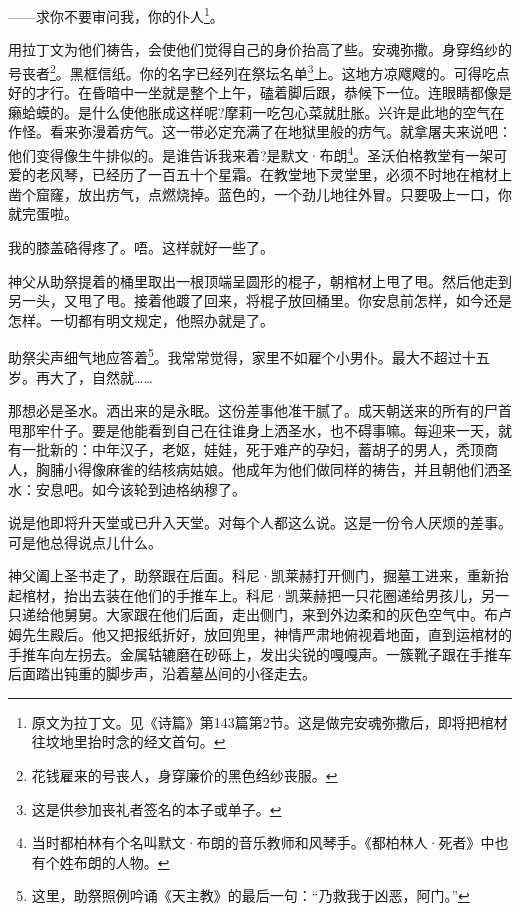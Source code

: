 \par ——求你不要审问我，你的仆人\footnote{原文为拉丁文。见《诗篇》第143篇第2节。这是做完安魂弥撒后，即将把棺材往坟地里抬时念的经文首句。}。
\par 用拉丁文为他们祷告，会使他们觉得自己的身价抬高了些。安魂弥撒。身穿绉纱的号丧者\footnote{花钱雇来的号丧人，身穿廉价的黑色绉纱丧服。}。黑框信纸。你的名字已经列在祭坛名单\footnote{这是供参加丧礼者签名的本子或单子。}上。这地方凉飕飕的。可得吃点好的才行。在昏暗中一坐就是整个上午，磕着脚后跟，恭候下一位。连眼睛都像是癞蛤蟆的。是什么使他胀成这样呢?摩莉一吃包心菜就肚胀。兴许是此地的空气在作怪。看来弥漫着疠气。这一带必定充满了在地狱里般的疠气。就拿屠夫来说吧：他们变得像生牛排似的。是谁告诉我来着?是默文·布朗\footnote{当时都柏林有个名叫默文·布朗的音乐教师和风琴手。《都柏林人·死者》中也有个姓布朗的人物。}。圣沃伯格教堂有一架可爱的老风琴，已经历了一百五十个星霜。在教堂地下灵堂里，必须不时地在棺材上凿个窟窿，放出疠气，点燃烧掉。蓝色的，一个劲儿地往外冒。只要吸上一口，你就完蛋啦。
\par 我的膝盖硌得疼了。唔。这样就好一些了。
\par 神父从助祭提着的桶里取出一根顶端呈圆形的棍子，朝棺材上甩了甩。然后他走到另一头，又甩了甩。接着他踱了回来，将棍子放回桶里。你安息前怎样，如今还是怎样。一切都有明文规定，他照办就是了。
\par 助祭尖声细气地应答着\footnote{这里，助祭照例吟诵《天主教》的最后一句：“乃救我于凶恶，阿门。”}。我常常觉得，家里不如雇个小男仆。最大不超过十五岁。再大了，自然就……
\par 那想必是圣水。洒出来的是永眠。这份差事他准干腻了。成天朝送来的所有的尸首甩那牢什子。要是他能看到自己在往谁身上洒圣水，也不碍事嘛。每迎来一天，就有一批新的：中年汉子，老妪，娃娃，死于难产的孕妇，蓄胡子的男人，秃顶商人，胸脯小得像麻雀的结核病姑娘。他成年为他们做同样的祷告，并且朝他们洒圣水：安息吧。如今该轮到迪格纳穆了。
\par 说是他即将升天堂或已升入天堂。对每个人都这么说。这是一份令人厌烦的差事。可是他总得说点儿什么。
\par 神父阖上圣书走了，助祭跟在后面。科尼·凯莱赫打开侧门，掘墓工进来，重新抬起棺材，抬出去装在他们的手推车上。科尼·凯莱赫把一只花圈递给男孩儿，另一只递给他舅舅。大家跟在他们后面，走出侧门，来到外边柔和的灰色空气中。布卢姆先生殿后。他又把报纸折好，放回兜里，神情严肃地俯视着地面，直到运棺材的手推车向左拐去。金属轱辘磨在砂砾上，发出尖锐的嘎嘎声。一簇靴子跟在手推车后面踏出钝重的脚步声，沿着墓丛间的小径走去。
